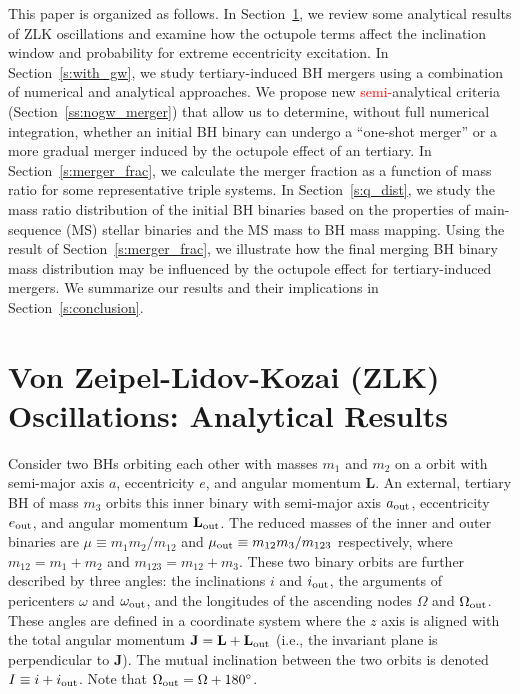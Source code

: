 \documentclass[
        fleqn,
        usenatbib,
    ]{mnras}
\newcommand*{\bm}[1]{\mathbf{#1}}
\begin{document}
This paper is organized as follows. In Section~\ref{s:background}, we review
some analytical results of ZLK oscillations and examine how the octupole terms
affect the inclination window and probability for extreme eccentricity
excitation. In Section~\ref{s:with_gw}, we study tertiary-induced BH mergers
using a combination of numerical and analytical approaches. We propose new
\textcolor{red}{semi-}analytical criteria (Section~\ref{ss:nogw_merger}) that
allow us to determine, without full numerical integration, whether an initial BH
binary can undergo a ``one-shot merger'' or a more gradual merger induced by the
octupole effect of an tertiary. In Section~\ref{s:merger_frac}, we calculate the
merger fraction as a function of mass ratio for some representative triple
systems. In Section~\ref{s:q_dist}, we study the mass ratio distribution of the
initial BH binaries based on the properties of main-sequence (MS) stellar
binaries and the MS mass to BH mass mapping. Using the result of
Section~\ref{s:merger_frac}, we illustrate how the final merging BH binary mass
distribution may be influenced by the octupole effect for tertiary-induced
mergers. We summarize our results and their implications in
Section~\ref{s:conclusion}.

\section{Von Zeipel-Lidov-Kozai (ZLK) Oscillations: Analytical
Results}\label{s:background}

Consider two BHs orbiting each other with masses $m_1$ and $m_2$ on a orbit with
semi-major axis $a$, eccentricity $e$, and angular momentum $\bm{L}$. An external,
tertiary BH of mass $m_3$ orbits this inner binary with semi-major axis $a_{\rm
out}$, eccentricity $e_{\rm out}$, and angular momentum $\bm{L}_{\rm out}$. The
reduced masses of the inner and outer binaries are $\mu \equiv m_1m_2 / m_{12}$
and $\mu_{\rm out} \equiv m_{12} m_3 / m_{123}$ respectively, where $m_{12} =
m_1 + m_2$ and $m_{123} = m_{12} + m_3$. These two binary orbits are further
described by three angles: the inclinations $i$ and $i_{\rm out}$, the arguments
of pericenters $\omega$ and $\omega_{\rm out}$, and the longitudes of the
ascending nodes $\Omega$ and $\Omega_{\rm out}$. These angles are defined in a
coordinate system where the $z$ axis is aligned with the total angular momentum
$\bm{J} = \bm{L} + \bm{L}_{\rm out}$ (i.e., the invariant plane is perpendicular
to $\bm{J}$). The mutual inclination between the two orbits is denoted $I \equiv
i + i_{\rm out}$. Note that $\Omega_{\rm out} = \Omega + 180^\circ$.
\end{document}
